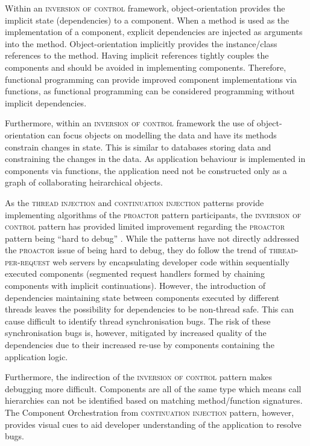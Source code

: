 \documentclass[prodmode]{style/acmlarge}
\begin{document}
Within an \textsc{inversion of control} framework, object-orientation provides
the implicit state (dependencies) to a component.  When a method is used as the
implementation of a component, explicit dependencies are injected as arguments
into the method.  Object-orientation implicitly provides the instance/class
references to the method.  Having implicit references tightly couples the
components and should be avoided in implementing components.  Therefore,
functional programming can provide improved component implementations via
functions, as functional programming can be considered programming without
implicit dependencies.

Furthermore, within an \textsc{inversion of control} framework the use of
object-orientation can focus objects on modelling the data and have its methods
constrain changes in state.  This is similar to databases storing data and
constraining the changes in the data.  As application behaviour is implemented
in components via functions, the application need not be constructed only as a
graph of collaborating heirarchical objects.

As the \textsc{thread injection} and \textsc{continuation injection} patterns
provide implementing algorithms of the \textsc{proactor} pattern participants,
the \textsc{inversion of control} pattern has provided limited improvement
regarding the \textsc{proactor} pattern being ``hard to debug'' \cite[p.
7]{proactor}.  While the patterns have not directly addressed the
\textsc{proactor} issue of being hard to debug, they do follow the trend of
\textsc{thread-per-request} web servers \cite{thread-per-request} by
encapsulating developer code within sequentially executed components (segmented
request handlers formed by chaining components with implicit continuations). 
However, the introduction of dependencies maintaining state between components
executed by different threads leaves the possibility for dependencies to be
non-thread safe.  This can cause difficult to identify thread synchronisation
bugs.  The risk of these synchronisation bugs is, however, mitigated by
increased quality of the dependencies due to their increased re-use by
components containing the application logic.

Furthermore, the indirection of the \textsc{inversion of control} pattern makes
debugging more difficult.  Components are all of the same type which means call
hierarchies can not be identified based on matching method/function signatures.
The Component Orchestration from \textsc{continuation injection} pattern,
however, provides visual cues to aid developer understanding of the application
to resolve bugs.
\end{document}

